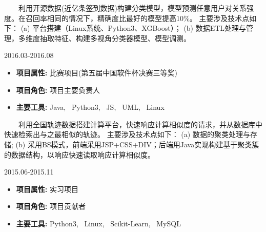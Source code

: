 \documentclass{resume}
\begin{document}
{ \ \ \ \ 利用开源数据(近亿条签到数据)构建分类模型，模型预测任意用户对关系强度。在召回率相同的情况下，精确度比最好的模型提高10\%。
主要涉及技术点如下：
(a) 平台搭建（Linux系统、Python3、XGBoost）；
(b) 数据ETL处理与管理，多维度抽取特征、构建多视角分类器模型、模型调测。}

\medskip





                                 {2016.03-2016.08}

\begin{itemize} [parsep=0.5ex]

  \item   \textbf{ 项目属性: }      {比赛项目(第五届中国软件杯决赛三等奖)}
  \item   \textbf{ 项目角色: }      {项目主要负责人}
  \item   \textbf{ 主要工具: }      { Java, \ Python3, \ JS, \ UML, \ Linux }

\end{itemize}


{ \ \ \ \ 利用全国轨迹数据搭建计算平台，快速响应计算相似度的请求，并从数据库中快速检索出与之最相似的轨迹。
主要涉及技术点如下：
(a) 数据的聚类处理与存储;
(b) 采用BS模式，前端采用JSP+CSS+DIV；后端用Java实现构建基于聚类簇的数据结构，以响应快速读取响应计算相似度。 }

\medskip





              {2015.06-2015.11}

\begin{itemize} [parsep=0.5ex]

  \item    \textbf{  项目属性:  }      { 实习项目 }
  \item       \textbf{  项目角色:  }       { 项目贡献者 }
  \item       \textbf{  主要工具:  }       { Python3, \ Linux, \ Scikit-Learn, \ MySQL }

\end{itemize}
\end{document}
